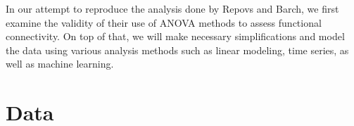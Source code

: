 \documentclass[11pt]{article}
\begin{document}
In our attempt to reproduce the analysis done by Repovs and Barch, we first
examine the validity of their use of ANOVA methods to assess functional
connectivity. On top of that, we will make necessary simplifications and model
the data using various analysis methods such as linear modeling, time series,
as well as machine learning. \par

\section{Data}
\end{document}
